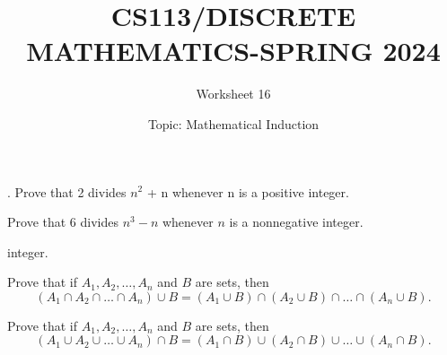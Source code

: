 \documentclass{exam}
\title{CS113/DISCRETE MATHEMATICS-SPRING 2024}
\author{Worksheet 16}
\date{Topic: Mathematical Induction}
\begin{document}
\maketitle

\begin{center}
\end{center}

\vspace{5mm}

\vspace{5mm}


\vspace{5mm}
\begin{questions}

\question
. Prove that 2 divides $n^2$ + n whenever n is a positive integer.
\vspace{9in}



\question Prove that $6$ divides $n^3 - n$ whenever $n$ is a nonnegative integer.

integer.
\vspace{9in}

\question Prove that if $A_1, A_2, \ldots, A_n$ and $B$ are sets, then
\[
(A_1 \cap A_2 \cap \ldots \cap A_n) \cup B = (A_1 \cup B) \cap (A_2 \cup B) \cap \ldots \cap (A_n \cup B).
\]

\vspace{9in}

\question Prove that if $A_1, A_2, \ldots, A_n$ and $B$ are sets, then
\[
(A_1 \cup A_2 \cup \ldots \cup A_n) \cap B = (A_1 \cap B) \cup (A_2 \cap B) \cup \ldots \cup (A_n \cap B).
\]

\vspace{9in}



\end{questions}
\end{document}
